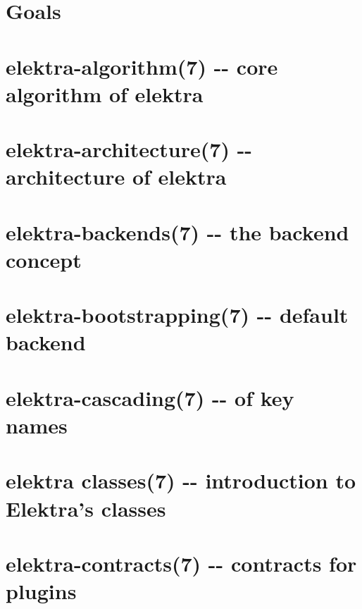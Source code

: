 \documentclass[twoside]{book}
\newcommand{\+}{\discretionary{\mbox{\scriptsize$\hookleftarrow$}}{}{}}
\begin{document}
\chapter{Goals}
\label{doc_GOALS_md}
\hypertarget{doc_GOALS_md}{}

\chapter{elektra-\/algorithm(7) -\/-\/ core algorithm of elektra}
\label{md_doc_help_elektra-algorithm}
\hypertarget{md_doc_help_elektra-algorithm}{}

\chapter{elektra-\/architecture(7) -\/-\/ architecture of elektra}
\label{md_doc_help_elektra-architecture}
\hypertarget{md_doc_help_elektra-architecture}{}

\chapter{elektra-\/backends(7) -\/-\/ the backend concept}
\label{md_doc_help_elektra-backends}
\hypertarget{md_doc_help_elektra-backends}{}

\chapter{elektra-\/bootstrapping(7) -\/-\/ default backend}
\label{md_doc_help_elektra-bootstrapping}
\hypertarget{md_doc_help_elektra-bootstrapping}{}

\chapter{elektra-\/cascading(7) -\/-\/ of key names}
\label{md_doc_help_elektra-cascading}
\hypertarget{md_doc_help_elektra-cascading}{}

\chapter{elektra classes(7) -\/-\/ introduction to Elektra's classes}
\label{md_doc_help_elektra-classes}
\hypertarget{md_doc_help_elektra-classes}{}

\chapter{elektra-\/contracts(7) -\/-\/ contracts for plugins}
\label{md_doc_help_elektra-contracts}
\hypertarget{md_doc_help_elektra-contracts}{}

\end{document}
